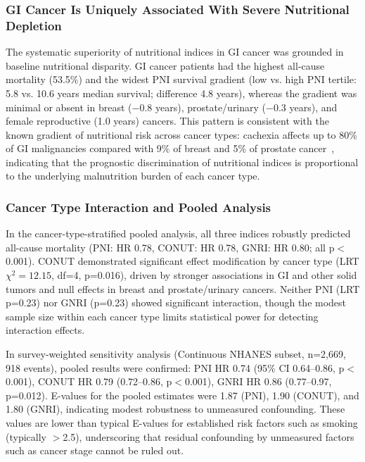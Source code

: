 \documentclass[review]{elsarticle}
\begin{document}
\subsubsection{GI Cancer Is Uniquely Associated With Severe Nutritional Depletion}

The systematic superiority of nutritional indices in GI cancer was grounded in baseline nutritional disparity. GI cancer patients had the highest all-cause mortality (53.5\%) and the widest PNI survival gradient (low vs. high PNI tertile: 5.8 vs. 10.6 years median survival; difference 4.8 years), whereas the gradient was minimal or absent in breast ($-$0.8 years), prostate/urinary ($-$0.3 years), and female reproductive (1.0 years) cancers. This pattern is consistent with the known gradient of nutritional risk across cancer types: cachexia affects up to 80\% of GI malignancies compared with 9\% of breast and 5\% of prostate cancer~\cite{kapala2025}, indicating that the prognostic discrimination of nutritional indices is proportional to the underlying malnutrition burden of each cancer type.

\subsubsection{Cancer Type Interaction and Pooled Analysis}

In the cancer-type-stratified pooled analysis, all three indices robustly predicted all-cause mortality (PNI: HR 0.78, CONUT: HR 0.78, GNRI: HR 0.80; all p$<$0.001). CONUT demonstrated significant effect modification by cancer type (LRT $\chi^2=12.15$, df=4, p=0.016), driven by stronger associations in GI and other solid tumors and null effects in breast and prostate/urinary cancers. Neither PNI (LRT p=0.23) nor GNRI (p=0.23) showed significant interaction, though the modest sample size within each cancer type limits statistical power for detecting interaction effects.

In survey-weighted sensitivity analysis (Continuous NHANES subset, n=2,669, 918 events), pooled results were confirmed: PNI HR 0.74 (95\% CI 0.64--0.86, p$<$0.001), CONUT HR 0.79 (0.72--0.86, p$<$0.001), GNRI HR 0.86 (0.77--0.97, p=0.012). E-values for the pooled estimates were 1.87 (PNI), 1.90 (CONUT), and 1.80 (GNRI), indicating modest robustness to unmeasured confounding. These values are lower than typical E-values for established risk factors such as smoking (typically $>$2.5), underscoring that residual confounding by unmeasured factors such as cancer stage cannot be ruled out.
\end{document}
